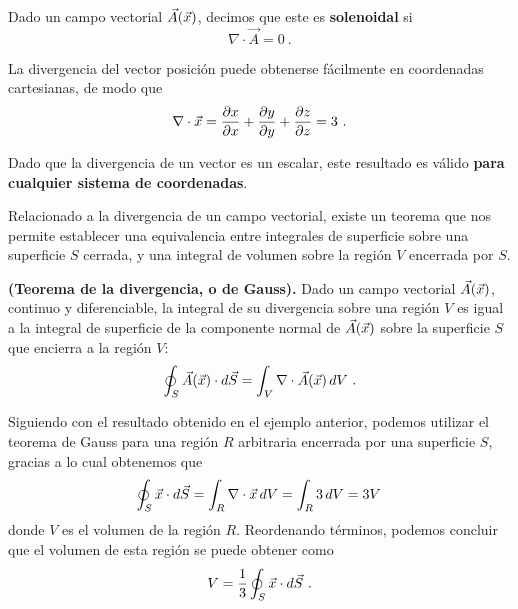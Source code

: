 \begin{defi}
    Dado un campo vectorial $\vec{A}(\vec{x})$, decimos que este es \textbf{solenoidal} si 
    \begin{equation}
        \nabla \cdot \vec{A} = 0 \ .
    \end{equation}
\end{defi}

\begin{ejemplo}
    La divergencia del vector posición puede obtenerse fácilmente en coordenadas cartesianas, de modo que 
    \begin{equation}
        \nabla \cdot \vec{x} = \frac{\partial x}{\partial x} + \frac{\partial y}{\partial y} + \frac{\partial z}{\partial z} = 3 \ .
    \end{equation}

    Dado que la divergencia de un vector es un escalar, este resultado es válido \textbf{para cualquier sistema de coordenadas}.
\end{ejemplo}


Relacionado a la divergencia de un campo vectorial, existe un teorema que nos permite establecer una equivalencia entre integrales de superficie sobre una superficie $S$ cerrada, y una integral de volumen sobre la región $V$ encerrada por $S$.

\begin{teorema}{\textbf{(Teorema de la divergencia, o de Gauss).}} 
    Dado un campo vectorial $\vec{A}(\vec{x})$, continuo y diferenciable, la integral de su divergencia sobre una región $V$ es igual a la integral de superficie de la componente normal de $\vec{A}(\vec{x})$ sobre la superficie $S$ que encierra a la región $V$:
    \begin{equation}
        \oint_S \vec{A}(\vec{x}) \cdot d\vec{S} = \int_V \nabla \cdot \vec{A}(\vec{x}) \, dV \ .
    \end{equation}
\end{teorema}

\begin{ejemplo}
    Siguiendo con el resultado obtenido en el ejemplo anterior, podemos utilizar el teorema de Gauss para una región $R$ arbitraria encerrada por una superficie $S$, gracias a lo cual obtenemos que 
    \begin{equation*}
        \oint_S \vec{x} \cdot d\vec{S} = \int_R \nabla \cdot \vec{x} \, dV = \int_R 3 \, dV = 3V \,
    \end{equation*}
    donde $V$ es el volumen de la región $R$. Reordenando términos, podemos concluir que el volumen de esta región se puede obtener como 
    \begin{equation}
        V = \frac{1}{3} \oint_S \vec{x} \cdot d\vec{S} \ .
    \end{equation}
\end{ejemplo}

